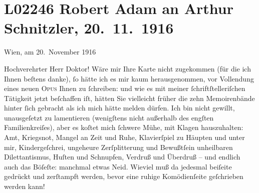 

\section[Robert Adam an Arthur Schnitzler, 20. 11. 1916]{L02246 Robert Adam an Arthur Schnitzler, 20. 11. 1916}
\nopagebreak{}
\rehead{ }\normalsize\beginnumbering{}
\toendnotes[C]{\smallbreak\pagebreak[2]}
\toendnotes[C]{\smallbreak}
\toendnotes[C]{\smallbreak}
\pstart
           \raggedleft{}{\pb}Wien, am 20. November 1916\pend
           
\pstart{}Hochverehrter Herr Doktor!\pend\vspace{0.5em}
\pstart
           Wäre mir Ihre Karte nicht zugekommen (für die ich Ihnen beſtens danke),{ }ſo hätte ich
               es mir kaum herausgenommen, vor Vollendung eines neuen \textsc{Opus}
               Ihnen zu{ }ſchreiben: und wie es mit meiner{ }ſchriftſtelleriſchen Tätigkeit jetzt
               beſchaffen iſt,  hätten Sie vielleicht früher die
               zehn Memoirenbände hinter{ }ſich
               gebracht als ich mich hätte melden dürfen. Ich bin nicht gewillt, unausgeſetzt zu
               lamentieren (wenigſtens nicht außerhalb des engſten Familienkreiſes), aber es koſtet
               mich{ }ſchwere Mühe, mit Klagen hauszuhalten: Amt, Kriegs{\pb}not, Mangel an Zeit und Ruhe, Klavierſpiel zu Häupten und unter mir,
               Kindergeſchrei, ungeheure Zerſplitterung und Bewußtſein unheilbaren Dilettantismus,
               Huſten und Schnupfen, Verdruß und Überdruß – und endlich auch das Böſeſte: manchmal
               etwas Neid. Wieviel muß da jedesmal beiſeite gedrückt und zerſtampft werden, bevor
               eine ruhige Komödienſeite geſchrieben werden kann!\pend
           
